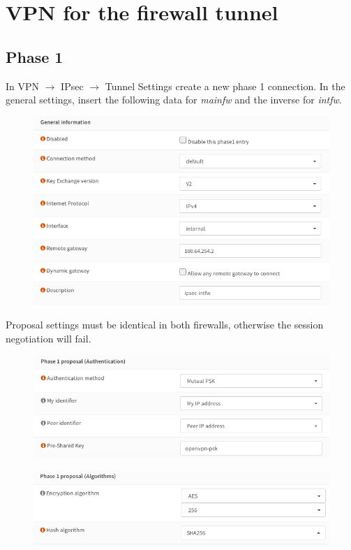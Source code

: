 \documentclass{homework}
\newcommand{\intfw}{\textit{intfw}\xspace}
\newcommand{\mainfw}{\textit{mainfw}\xspace}
\begin{document}
    
    \section{VPN for the firewall tunnel}
    \subsection{Phase 1}
    In VPN $\rightarrow$ IPsec $\rightarrow$ Tunnel Settings create a new phase 1 connection.
    In the general settings, insert the following data for \mainfw and the inverse for \intfw.
    \begin{figure}[H]
        \centering
        \includegraphics[width=\linewidth]{ipsec/phase1-general}
        \label{fig:ipsec-phase1-general}
    \end{figure}
    \vspace{-10pt}
%
    Proposal settings must be identical in both firewalls, otherwise the session negotiation will fail.
    \vspace{-5pt}
    \begin{figure}[H]
        \centering
        \includegraphics[width=\linewidth]{ipsec/phase1-proposal-auth}
        \label{fig:ipsec-phase1-proposal-auth}
    \end{figure}
    \begin{figure}[H]
        \centering
        \includegraphics[width=\linewidth]{ipsec/phase1-proposal-alg}
        \label{fig:ipsec-phase1-proposal-alg}
    \end{figure}
\end{document}
